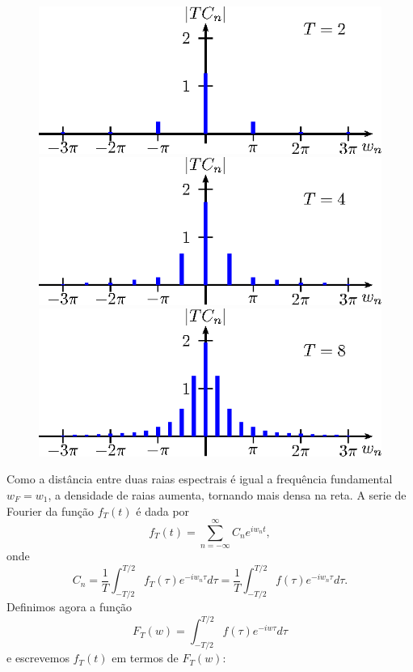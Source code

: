 \begin{ex}{\label{ex_Transf_1}}
\begin{figure}[!ht]
\includegraphics{cap_transformada_de_fourier/pics/figura_4}
\includegraphics{cap_transformada_de_fourier/pics/figura_5}
\includegraphics{cap_transformada_de_fourier/pics/figura_6}\caption{\label{dia_espc_tenda}}
\end{figure}
 \end{ex}
Como a distância entre duas raias espectrais é igual a frequência fundamental $w_F=w_1$, a densidade de raias aumenta, tornando mais densa na reta. A serie de Fourier da função $f_T(t)$ é dada por
$$
f_T(t)=\sum_{n=-\infty}^\infty C_n e^{i w_n t},
$$
onde 
\begin{equation}C_n=\frac{1}{T}\int_{-T/2}^{T/2}f_T(\tau)e^{-iw_n \tau}d\tau=\frac{1}{T}\int_{-T/2}^{T/2}f(\tau)e^{-iw_n \tau}d\tau.\end{equation}
Definimos agora a função \begin{equation}F_T(w)=\int_{-T/2}^{T/2}f(\tau)e^{-iw \tau}d\tau\end{equation} e escrevemos $f_T(t)$ em termos de $F_T(w)$:
